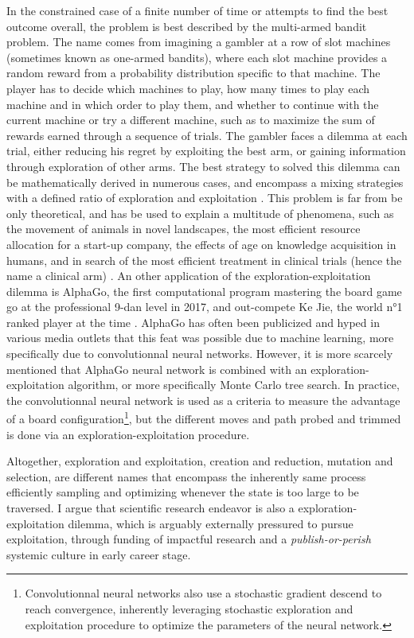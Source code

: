 In the constrained case of a finite number of time or attempts to find the best outcome overall, the problem is best described by the multi-armed bandit problem. The name comes from imagining a gambler at a row of slot machines (sometimes known as one-armed bandits), where each slot machine provides a random reward from a probability distribution specific to that machine. The player has to decide which machines to play, how many times to play each machine and in which order to play them, and whether to continue with the current machine or try a different machine, such as to maximize the sum of rewards earned through a sequence of trials.
The gambler faces a dilemma at each trial, either reducing his regret by exploiting the best arm, or gaining information through exploration of other arms.
The best strategy to solved this dilemma can be mathematically derived in numerous cases, and encompass a mixing strategies with a defined ratio of exploration and exploitation \citep{Auer2002,Kocsis2006,Furnkranz2006}.
This problem is far from be only theoretical, and has be used to explain a multitude of phenomena, such as the movement of animals in novel landscapes, the most efficient resource allocation for a start-up company, the effects of age on knowledge acquisition in humans, and in search of the most efficient treatment in clinical trials (hence the name a clinical arm) \citep{Berger-Tal2014, March}. 
An other application of the exploration-exploitation dilemma is AlphaGo, the first computational program mastering the board game go at the professional 9-dan level in 2017, and out-compete Ke Jie, the world n°1 ranked player at the time \citep{Silver2017, Silver2018}.
AlphaGo has often been publicized and hyped in various media outlets that this feat was possible due to machine learning, more specifically due to convolutionnal neural networks.
However, it is more scarcely mentioned that AlphaGo neural network is combined with an exploration-exploitation algorithm, or more specifically Monte Carlo tree search. 
In practice, the convolutionnal neural network is used as a criteria to measure the advantage of a board configuration\footnote{Convolutionnal neural networks also use a stochastic gradient descend to reach convergence, inherently leveraging stochastic exploration and exploitation procedure to optimize the parameters of the neural network.}, but the different moves and path probed and trimmed is done via an exploration-exploitation procedure. 


Altogether, exploration and exploitation, creation and reduction, mutation and selection, are different names that encompass the inherently same process efficiently sampling and optimizing whenever the state is too large to be traversed.
I argue that scientific research endeavor is also a exploration-exploitation dilemma, which is arguably externally pressured to pursue exploitation, through funding of impactful research and a \textit{publish-or-perish} systemic culture in early career stage.

